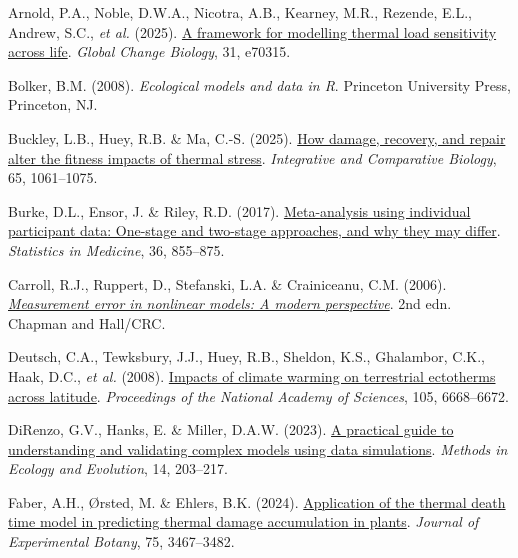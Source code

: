 \documentclass[
  11pt,
]{article}
\newlength{\cslhangindent}
\newenvironment{CSLReferences}[2] %
 {\begin{list}{}{%
  \setlength{\itemindent}{0pt}
  \setlength{\leftmargin}{0pt}
  \setlength{\parsep}{0pt}
  \ifodd #1
   \setlength{\leftmargin}{\cslhangindent}
   \setlength{\itemindent}{-1\cslhangindent}
  \fi
  \setlength{\itemsep}{#2\baselineskip}}}
 {\end{list}}
\begin{document}
\label{refs}
\begin{CSLReferences}{1}{0}
Arnold, P.A., Noble, D.W.A., Nicotra, A.B., Kearney, M.R., Rezende,
E.L., Andrew, S.C., \emph{et al.} (2025).
\href{https://doi.org/10.1111/gcb.70315}{A framework for modelling
thermal load sensitivity across life}. \emph{Global Change Biology}, 31,
e70315.

Bolker, B.M. (2008). \emph{Ecological models and data in {R}}. Princeton
University Press, Princeton, NJ.

Buckley, L.B., Huey, R.B. \& Ma, C.-S. (2025).
\href{https://doi.org/10.1093/icb/icaf019}{How damage, recovery, and
repair alter the fitness impacts of thermal stress}. \emph{Integrative
and Comparative Biology}, 65, 1061--1075.

Burke, D.L., Ensor, J. \& Riley, R.D. (2017).
\href{https://doi.org/10.1002/sim.7141}{Meta-analysis using individual
participant data: One-stage and two-stage approaches, and why they may
differ}. \emph{Statistics in Medicine}, 36, 855--875.

Carroll, R.J., Ruppert, D., Stefanski, L.A. \& Crainiceanu, C.M. (2006).
\emph{\href{https://doi.org/10.1201/9781420010138}{Measurement error in
nonlinear models: A modern perspective}}. 2nd edn. {Chapman and
Hall/CRC}.

Deutsch, C.A., Tewksbury, J.J., Huey, R.B., Sheldon, K.S., Ghalambor,
C.K., Haak, D.C., \emph{et al.} (2008).
\href{https://doi.org/10.1073/pnas.0709472105}{Impacts of climate
warming on terrestrial ectotherms across latitude}. \emph{Proceedings of
the National Academy of Sciences}, 105, 6668--6672.

DiRenzo, G.V., Hanks, E. \& Miller, D.A.W. (2023).
\href{https://doi.org/10.1111/2041-210X.14030}{A practical guide to
understanding and validating complex models using data simulations}.
\emph{Methods in Ecology and Evolution}, 14, 203--217.

Faber, A.H., Ørsted, M. \& Ehlers, B.K. (2024).
\href{https://doi.org/10.1093/jxb/erae096}{Application of the thermal
death time model in predicting thermal damage accumulation in plants}.
\emph{Journal of Experimental Botany}, 75, 3467--3482.


\end{CSLReferences}
\end{document}
